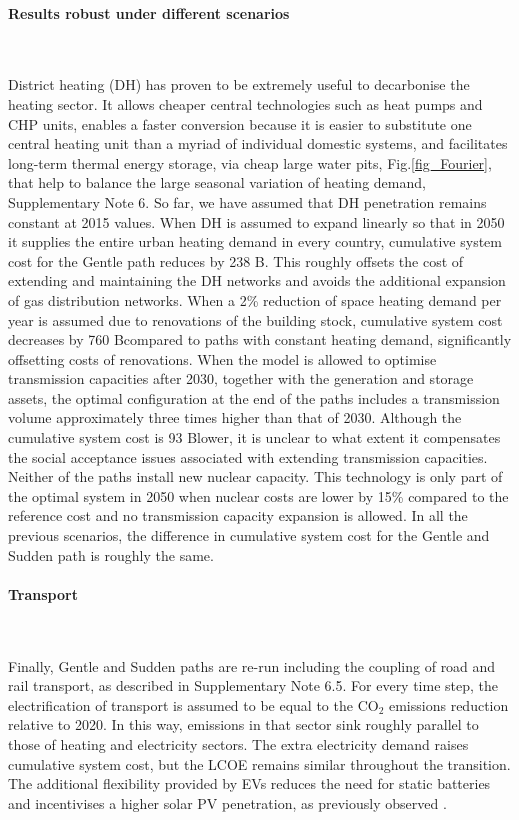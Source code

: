 \documentclass[5p]{elsarticle} %
\begin{document}
 
\paragraph{\textbf{Results robust under different scenarios}} \

District heating (DH) has proven to be extremely useful to decarbonise the heating sector. It allows cheaper central technologies such as heat pumps and CHP units, enables a faster conversion because it is easier to substitute one central heating unit than a myriad of individual domestic systems, and facilitates long-term thermal energy storage, via cheap large water pits, Fig.\ref{fig_Fourier}, that help to balance the large seasonal variation of heating demand, Supplementary Note 6. So far, we have assumed that DH penetration remains constant at 2015 values. When DH is assumed to expand linearly so that in 2050 it supplies the entire urban heating demand in every country, cumulative system cost for the Gentle path reduces by 238 B\EUR. This roughly offsets the cost of extending and maintaining the DH networks and avoids the additional expansion of gas distribution networks. When a 2\% reduction of space heating demand per year is assumed due to renovations of the building stock, cumulative system cost decreases by 760 B\EUR compared to paths with constant heating demand, significantly offsetting costs of renovations. When the model is allowed to optimise transmission capacities after 2030, together with the generation and storage assets, the optimal configuration at the end of the paths includes a transmission volume approximately three times higher than that of 2030. Although the cumulative system cost is 93 B\EUR lower, it is unclear to what extent it compensates the social acceptance issues associated with extending transmission capacities. Neither of the paths install new nuclear capacity. This technology is only part of the optimal system in 2050 when nuclear costs are lower by 15\% compared to the reference cost and no transmission capacity expansion is allowed. In all the previous scenarios, the difference in cumulative system cost for the Gentle and Sudden path is roughly the same.

\paragraph{\textbf{Transport}} \

Finally, Gentle and Sudden paths are re-run including the coupling of road and rail transport, as described in Supplementary Note 6.5. For every time step, the electrification of transport is assumed to be equal to the CO$_2$ emissions reduction relative to 2020. In this way, emissions in that sector sink roughly parallel to those of heating and electricity sectors. The extra electricity demand raises cumulative system cost, but the LCOE remains similar throughout the transition. The additional flexibility provided by EVs reduces the need for static batteries and incentivises a higher solar PV penetration, as previously observed \cite{Brown_2018, Victoria_2019_storage}.
\end{document}
